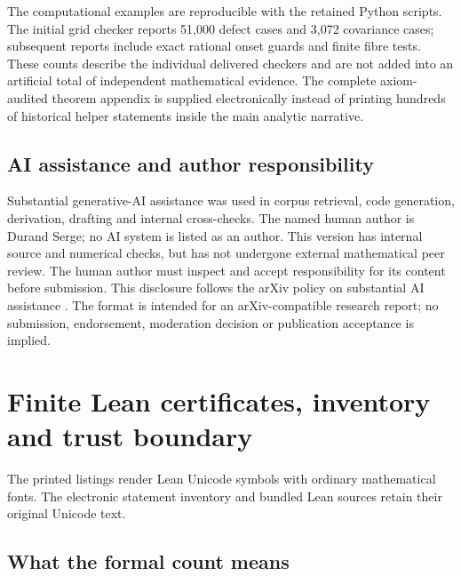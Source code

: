 \documentclass[11pt,a4paper]{article}
\theoremstyle{definition}
\theoremstyle{remark}
\begin{document}
The computational examples are reproducible with the retained Python scripts. The initial grid checker reports 51,000 defect cases and 3,072 covariance cases; subsequent reports include exact rational onset guards and finite fibre tests. These counts describe the individual delivered checkers and are not added into an artificial total of independent mathematical evidence. The complete axiom-audited theorem appendix is supplied electronically instead of printing hundreds of historical helper statements inside the main analytic narrative.

\subsection{AI assistance and author responsibility}
Substantial generative-AI assistance was used in corpus retrieval, code generation, derivation, drafting and internal cross-checks. The named human author is Durand Serge; no AI system is listed as an author. This version has internal source and numerical checks, but has not undergone external mathematical peer review. The human author must inspect and accept responsibility for its content before submission. This disclosure follows the arXiv policy on substantial AI assistance \cite{arxivpolicy}. The format is intended for an arXiv-compatible research report; no submission, endorsement, moderation decision or publication acceptance is implied.



\appendix


\section{Finite Lean certificates, inventory and trust boundary}
\label{app:lean-certificates}
\begingroup
{}
\lstset{style=GoldbachLeanAppendix}
The printed listings render Lean Unicode symbols with ordinary mathematical
fonts. The electronic statement inventory and bundled Lean sources retain
their original Unicode text.

\subsection{What the formal count means}
\end{document}
